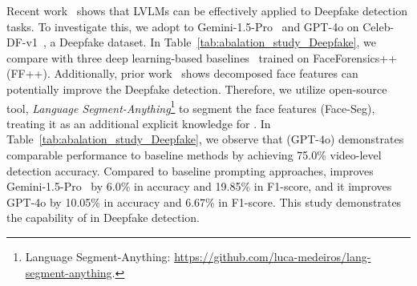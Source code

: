 Recent work~\cite{jia2024chatgptdetectDeepfakesstudy} shows that LVLMs can be effectively applied to Deepfake detection tasks.
To investigate this, we adopt \lavid to Gemini-1.5-Pro~\cite{google2024gemini} and GPT-4o on Celeb-DF-v1~\cite{Celeb_DF_cvpr20}, a Deepfake dataset. 
In Table~\ref{tab:abalation_study_Deepfake}, we compare \lavid with three deep learning-based baselines~\cite{9878441, guo2023controllableguidespacegeneralizableface, zhao2021multiattentionalDeepfakedetection} trained on FaceForensics++ ~\cite{roessler2019faceforensicspp} (FF++). 
Additionally, prior work~\cite{jia2024chatgptdetectDeepfakesstudy} shows decomposed face features can potentially improve the Deepfake detection. Therefore, we utilize open-source tool, \emph{Language Segment-Anything}\footnote{Language Segment-Anything: \url{https://github.com/luca-medeiros/lang-segment-anything}.} to segment the face features (Face-Seg), treating it as an additional explicit knowledge for \lavid. In Table~\ref{tab:abalation_study_Deepfake},
we observe that \lavid(GPT-4o) demonstrates comparable performance to baseline methods by achieving 75.0\% video-level detection accuracy. Compared to baseline prompting approaches, \lavid improves Gemini-1.5-Pro~\cite{google2024gemini} by 6.0\% in accuracy and 19.85\% in F1-score, and it improves GPT-4o by 10.05\% in accuracy and 6.67\% in F1-score. This study demonstrates the capability of \lavid in Deepfake detection.

